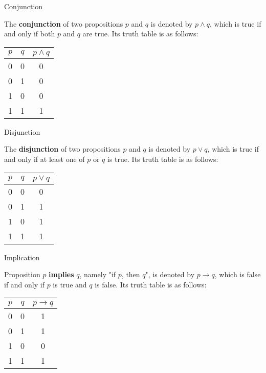\documentclass[11pt]{elegantbook}
\begin{document}
\begin{leftbarTitle}{Conjunction}\end{leftbarTitle}
The \textbf{conjunction} of two propositions \(p\) and \(q\) is denoted by \(p \land q\),
which is true if and only if both \(p\) and \(q\) are true.
Its truth table is as follows:
\begin{center}
\begin{tabular}{ccc}
\toprule
$p$ & $q$ & $p \land q$ \\ %
\midrule
0 & 0 & 0 \\ %
0 & 1 & 0 \\ %
1 & 0 & 0 \\ %
1 & 1 & 1 \\ %
\bottomrule
\end{tabular}
\end{center}

\begin{leftbarTitle}{Disjunction}\end{leftbarTitle}
The \textbf{disjunction} of two propositions \(p\) and \(q\) is denoted by \(p \lor q\),
which is true if and only if at least one of \(p\) or \(q\) is true.
Its truth table is as follows:
\begin{center}
\begin{tabular}{ccc}
\toprule
$p$ & $q$ & $p \lor q$ \\ %
\midrule
0 & 0 & 0 \\ %
0 & 1 & 1 \\ %
1 & 0 & 1 \\ %
1 & 1 & 1 \\ %
\bottomrule
\end{tabular}
\end{center}

\begin{leftbarTitle}{Implication}\end{leftbarTitle}
Proposition \(p\) \textbf{implies} \(q\), namely "if \(p\), then \(q\)", is denoted by \(p \to q\),
which is false if and only if \(p\) is true and \(q\) is false.
Its truth table is as follows:
\begin{center}
\begin{tabular}{ccc}
\toprule
$p$ & $q$ & $p \to q$ \\ %
\midrule
0 & 0 & 1 \\ %
0 & 1 & 1 \\ %
1 & 0 & 0 \\ %
1 & 1 & 1 \\ %
\bottomrule
\end{tabular}
\end{center}
\end{document}

